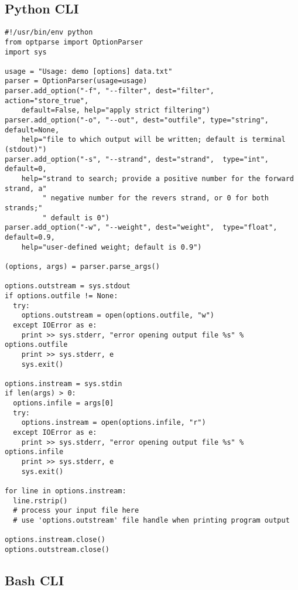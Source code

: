 \documentclass{article}
\begin{document}
\subsection{Python CLI}

\begin{verbatim}
#!/usr/bin/env python
from optparse import OptionParser
import sys

usage = "Usage: demo [options] data.txt"
parser = OptionParser(usage=usage)
parser.add_option("-f", "--filter", dest="filter", action="store_true",
    default=False, help="apply strict filtering")
parser.add_option("-o", "--out", dest="outfile", type="string", default=None,
    help="file to which output will be written; default is terminal (stdout)")
parser.add_option("-s", "--strand", dest="strand",  type="int", default=0,
    help="strand to search; provide a positive number for the forward strand, a"
         " negative number for the revers strand, or 0 for both strands;"
         " default is 0")
parser.add_option("-w", "--weight", dest="weight",  type="float", default=0.9,
    help="user-defined weight; default is 0.9")

(options, args) = parser.parse_args()

options.outstream = sys.stdout
if options.outfile != None:
  try:
    options.outstream = open(options.outfile, "w")
  except IOError as e:
    print >> sys.stderr, "error opening output file %s" % options.outfile
    print >> sys.stderr, e
    sys.exit()

options.instream = sys.stdin
if len(args) > 0:
  options.infile = args[0]
  try:
    options.instream = open(options.infile, "r")
  except IOError as e:
    print >> sys.stderr, "error opening output file %s" % options.infile
    print >> sys.stderr, e
    sys.exit()

for line in options.instream:
  line.rstrip()
  # process your input file here
  # use 'options.outstream' file handle when printing program output
  
options.instream.close()
options.outstream.close()
\end{verbatim}

\subsection{Bash CLI}
\end{document}
